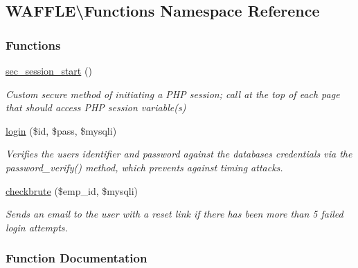 \hypertarget{namespace_w_a_f_f_l_e_1_1_functions}{}\subsection{W\+A\+F\+F\+LE\textbackslash{}Functions Namespace Reference}
\label{namespace_w_a_f_f_l_e_1_1_functions}
\subsubsection*{Functions}
\begin{DoxyCompactItemize}
\item 
\hyperlink{namespace_w_a_f_f_l_e_1_1_functions_a09d3696edbb60db132cbac829c0a96dd}{sec\+\_\+session\+\_\+start} ()
\begin{DoxyCompactList}\small\item\em Custom secure method of initiating a P\+HP session; call at the top of each page that should access P\+HP session variable(s) \end{DoxyCompactList}\item 
\hyperlink{namespace_w_a_f_f_l_e_1_1_functions_a7573c72280bfa987322364343fd97eec}{login} (\$id, \$pass, \$mysqli)
\begin{DoxyCompactList}\small\item\em Verifies the user\textquotesingle{}s identifier and password against the database\textquotesingle{}s credentials via the \textquotesingle{}password\+\_\+verify()\textquotesingle{} method, which prevents against timing attacks. \end{DoxyCompactList}\item 
\hyperlink{namespace_w_a_f_f_l_e_1_1_functions_a0a6eed95810480a504f0334d3c23ccbc}{checkbrute} (\$emp\+\_\+id, \$mysqli)
\begin{DoxyCompactList}\small\item\em Sends an email to the user with a reset link if there has been more than 5 failed login attempts. \end{DoxyCompactList}\end{DoxyCompactItemize}


\subsubsection{Function Documentation}
\mbox{\label{namespace_w_a_f_f_l_e_1_1_functions_a0a6eed95810480a504f0334d3c23ccbc}} 
